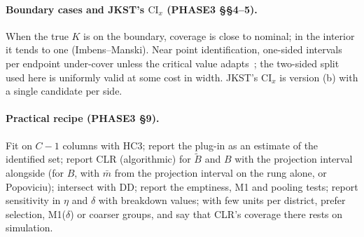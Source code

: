 \paragraph{Boundary cases and JKST's $\mathrm{CI}_x$ (PHASE3 \S\S4--5).} When the
true $K$ is on the boundary, coverage is close to nominal; in the interior it tends
to one (Imbens--Manski). Near point identification, one-sided intervals per
endpoint under-cover unless the critical value adapts~\citep{stoye2009}; the
two-sided split used here is uniformly valid at some cost in width. JKST's
$\mathrm{CI}_x$ is version (b) with a single candidate per side.

\paragraph{Practical recipe (PHASE3 \S9).} Fit on $C-1$ columns with HC3; report
the plug-in as an estimate of the identified set; report CLR (algorithmic) for
$\tilde B$ and $B$ with the projection interval alongside (for $B$, with $\bar m$
from the projection interval on the rung alone, or Popoviciu); intersect with DD;
report the emptiness, M1 and pooling tests; report sensitivity in $\eta$ and
$\delta$ with breakdown values; with few units per district, prefer selection,
M1($\delta$) or coarser groups, and say that CLR's coverage there rests on
simulation.
